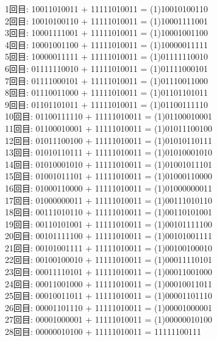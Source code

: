 \documentclass[titlepage]{jsarticle}
\theoremstyle{definition}
\begin{document}
1回目: 10011010011 + 11111010011 = (1)10010100110 \\
2回目: 10010100110 + 11111010011 = (1)10001111001 \\
3回目: 10001111001 + 11111010011 = (1)10001001100 \\
4回目: 10001001100 + 11111010011 = (1)10000011111 \\
5回目: 10000011111 + 11111010011 = (1)01111110010 \\
6回目: 01111110010 + 11111010011 = (1)01111000101 \\
7回目: 01111000101 + 11111010011 = (1)01110011000 \\
8回目: 01110011000 + 11111010011 = (1)01101101011 \\
9回目: 01101101011 + 11111010011 = (1)01100111110 \\
10回目: 01100111110 + 11111010011 = (1)01100010001 \\
11回目: 01100010001 + 11111010011 = (1)01011100100 \\
12回目: 01011100100 + 11111010011 = (1)01010110111 \\
13回目: 01010110111 + 11111010011 = (1)01010001010 \\
14回目: 01010001010 + 11111010011 = (1)01001011101 \\
15回目: 01001011101 + 11111010011 = (1)01000110000 \\
16回目: 01000110000 + 11111010011 = (1)01000000011 \\
17回目: 01000000011 + 11111010011 = (1)00111010110 \\
18回目: 00111010110 + 11111010011 = (1)00110101001 \\
19回目: 00110101001 + 11111010011 = (1)00101111100 \\
20回目: 00101111100 + 11111010011 = (1)00101001111 \\
21回目: 00101001111 + 11111010011 = (1)00100100010 \\
22回目: 00100100010 + 11111010011 = (1)00011110101 \\
23回目: 00011110101 + 11111010011 = (1)00011001000 \\
24回目: 00011001000 + 11111010011 = (1)00010011011 \\
25回目: 00010011011 + 11111010011 = (1)00001101110 \\
26回目: 00001101110 + 11111010011 = (1)00001000001 \\
27回目: 00001000001 + 11111010011 = (1)00000010100 \\
28回目: 00000010100 + 11111010011 = 11111100111
\end{document}
